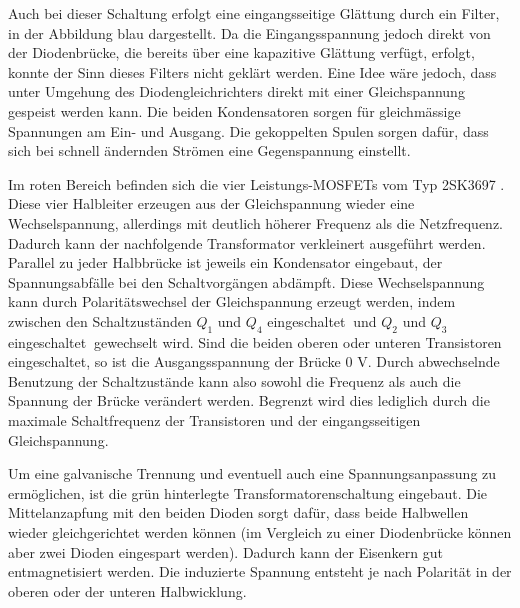 Auch bei dieser Schaltung erfolgt eine eingangsseitige Glättung durch ein Filter, in der Abbildung blau dargestellt. Da die Eingangsspannung jedoch direkt von der Diodenbrücke, die bereits über eine kapazitive Glättung verfügt, erfolgt, konnte der Sinn dieses Filters nicht geklärt werden. Eine Idee wäre jedoch, dass unter Umgehung des Diodengleichrichters direkt mit einer Gleichspannung gespeist werden kann. Die beiden Kondensatoren sorgen für gleichmässige Spannungen am Ein- und Ausgang. Die gekoppelten Spulen sorgen dafür, dass sich bei schnell ändernden Strömen eine Gegenspannung einstellt.

Im roten Bereich befinden sich die vier Leistungs-MOSFETs vom Typ 2SK3697 \cite{2sk3697}. Diese vier Halbleiter erzeugen aus der Gleichspannung wieder eine Wechselspannung, allerdings mit deutlich höherer Frequenz als die Netzfrequenz. Dadurch kann der nachfolgende Transformator verkleinert ausgeführt werden. Parallel zu jeder Halbbrücke ist jeweils ein Kondensator eingebaut, der Spannungsabfälle bei den Schaltvorgängen abdämpft. Diese Wechselspannung kann durch Polaritätswechsel der Gleichspannung erzeugt werden, indem zwischen den Schaltzuständen \grqq $Q_1$ und $Q_4$ eingeschaltet\grqq$~$ und \grqq $Q_2$ und $Q_3$ eingeschaltet\grqq$~$ gewechselt wird. Sind die beiden oberen oder unteren Transistoren eingeschaltet, so ist die Ausgangsspannung der Brücke $0$ V. Durch abwechselnde Benutzung der Schaltzustände kann also sowohl die Frequenz als auch die Spannung der Brücke verändert werden. Begrenzt wird dies lediglich durch die maximale Schaltfrequenz der Transistoren und der eingangsseitigen Gleichspannung.

Um eine galvanische Trennung und eventuell auch eine Spannungsanpassung zu ermöglichen, ist die grün hinterlegte Transformatorenschaltung eingebaut. Die Mittelanzapfung mit den beiden Dioden sorgt dafür, dass beide Halbwellen wieder gleichgerichtet werden können (im Vergleich zu einer Diodenbrücke können aber zwei Dioden eingespart werden). Dadurch kann der Eisenkern gut entmagnetisiert werden. Die induzierte Spannung entsteht je nach Polarität in der oberen oder der unteren Halbwicklung.

